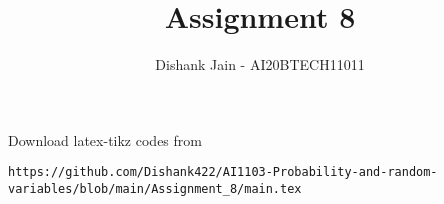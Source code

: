 \documentclass[journal,12pt,twocolumn]{IEEEtran}
\DeclareMathOperator*{\Res}{Res}
\begin{document}
\newcommand{\BEQA}{\begin{eqnarray}}
\newcommand{\EEQA}{\end{eqnarray}}
\newcommand{\define}{\stackrel{\triangle}{=}}

\raggedbottom
\setlength{\parindent}{0pt}
\providecommand{\mbf}{\mathbf}
\providecommand{\pr}[1]{\ensuremath{\Pr\left(#1\right)}}
\providecommand{\qfunc}[1]{\ensuremath{Q\left(#1\right)}}
\providecommand{\sbrak}[1]{\ensuremath{{}\left[#1\right]}}
\providecommand{\lsbrak}[1]{\ensuremath{{}\left[#1\right.}}
\providecommand{\rsbrak}[1]{\ensuremath{{}\left.#1\right]}}
\providecommand{\brak}[1]{\ensuremath{\left(#1\right)}}
\providecommand{\lbrak}[1]{\ensuremath{\left(#1\right.}}
\providecommand{\rbrak}[1]{\ensuremath{\left.#1\right)}}
\providecommand{\cbrak}[1]{\ensuremath{\left\{#1\right\}}}
\providecommand{\lcbrak}[1]{\ensuremath{\left\{#1\right.}}
\providecommand{\rcbrak}[1]{\ensuremath{\left.#1\right\}}}
\theoremstyle{remark}
\newtheorem{rem}{Remark}
\newcommand{\sgn}{\mathop{\mathrm{sgn}}}
\providecommand{\abs}[1]{\vert#1\vert}
\providecommand{\res}[1]{\Res\displaylimits_{#1}} 
\providecommand{\norm}[1]{\lVert#1\rVert}
\providecommand{\mtx}[1]{\mathbf{#1}}
\providecommand{\mean}[1]{E[ #1 ]}
\providecommand{\fourier}{\overset{\mathcal{F}}{ \rightleftharpoons}}
\providecommand{\system}{\overset{\mathcal{H}}{ \longleftrightarrow}}
\newcommand{\solution}{\noindent \textbf{Solution: }}
\newcommand{\cosec}{\,\text{cosec}\,}
\providecommand{\dec}[2]{\ensuremath{\overset{#1}{\underset{#2}{\gtrless}}}}
\newcommand{\myvec}[1]{\ensuremath{\begin{pmatrix}#1\end{pmatrix}}}
\newcommand{\mydet}[1]{\ensuremath{\begin{vmatrix}#1\end{vmatrix}}}
\makeatletter
{}
\makeatother
\let\StandardTheFigure\thefigure
\let\vec\mathbf
\renewcommand{\thefigure}{\theproblem}
\def\putbox#1#2#3{\makebox[0in][l]{\makebox[#1][l]{}\raisebox{\baselineskip}[0in][0in]{\raisebox{#2}[0in][0in]{#3}}}}
     \def\rightbox#1{\makebox[0in][r]{#1}}
     \def\centbox#1{\makebox[0in]{#1}}
     \def\topbox#1{\raisebox{-\baselineskip}[0in][0in]{#1}}
     \def\midbox#1{\raisebox{-0.5\baselineskip}[0in][0in]{#1}}
\vspace{3cm}
\title{Assignment 8}
\author{Dishank Jain - AI20BTECH11011}
\maketitle
\newpage
\bigskip
\renewcommand{\thefigure}{\theenumi}
\renewcommand{\thetable}{\theenumi}
Download latex-tikz codes from 
%
\begin{lstlisting}
https://github.com/Dishank422/AI1103-Probability-and-random-variables/blob/main/Assignment_8/main.tex
\end{lstlisting}
\end{document}
